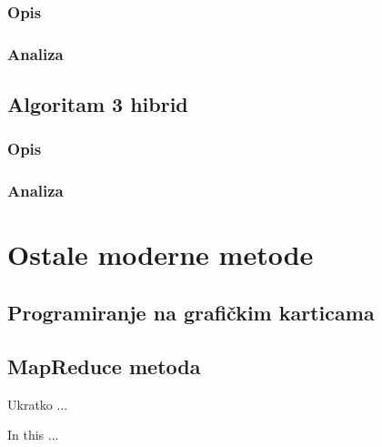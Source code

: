 \documentclass[a4paper,twoside,12pt]{memoir} %
\begin{document}
\subsection{Opis}
\subsection{Analiza}
\section{Algoritam 3 hibrid}
\subsection{Opis}
\subsection{Analiza}
\chapter{Ostale moderne metode}
\section{Programiranje na grafičkim karticama}
\section{MapReduce metoda}



\pagestyle{empty} %


\begin{sazetak}
Ukratko ...
\end{sazetak}

\begin{summary}
In this ...
\end{summary}

\end{document}

